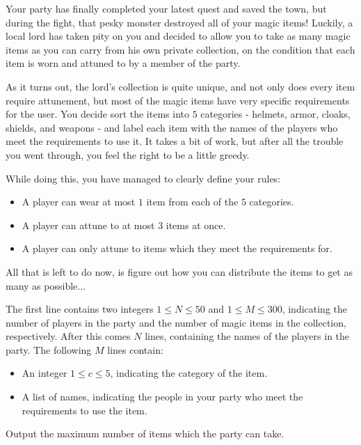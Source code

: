 
Your party has finally completed your latest quest and saved the town, but during the fight, that pesky monster destroyed all of your magic items!
Luckily, a local lord has taken pity on you and decided to allow you to take as many magic items as you can carry from his own private collection, on the condition that each item is worn and attuned to by a member of the party.

As it turns out, the lord's collection is quite unique, and not only does every item require attunement, but most of the magic items have very specific requirements for the user.
You decide sort the items into $5$ categories - helmets, armor, cloaks, shields, and weapons - and label each item with the names of the players who meet the requirements to use it.
It takes a bit of work, but after all the trouble you went through, you feel the right to be a little greedy.

While doing this, you have managed to clearly define your rules:

\begin{itemize}
\item A player can wear at most $1$ item from each of the $5$ categories.
\item A player can attune to at most $3$ items at once.
\item A player can only attune to items which they meet the requirements for.
\end{itemize}

All that is left to do now, is figure out how you can distribute the items to get as many as possible...

\begin{Input}

The first line contains two integers $1 \leq N \leq 50$ and $1 \leq M \leq 300$, indicating the number of players in the party and the number of magic items in the collection, respectively.
After this comes $N$ lines, containing the names of the players in the party.
The following $M$ lines contain:

\begin{itemize}
\item An integer $1 \leq c \leq 5$, indicating the category of the item.
\item A list of names, indicating the people in your party who meet the requirements to use the item.
\end{itemize}
\end{Input}

\begin{Output}
    
Output the maximum number of items which the party can take.
\end{Output}